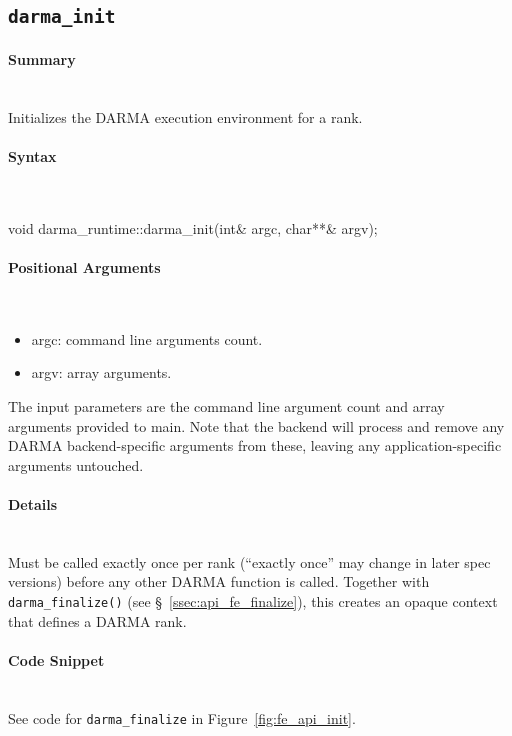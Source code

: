 
\subsection{\texttt{darma\_init}}

\paragraph{Summary}\mbox{}\\
Initializes the DARMA execution environment for a rank.

\paragraph{Syntax}\mbox{}\\
\begin{CppCode}
void darma_runtime::darma_init(int& argc, char**& argv);
\end{CppCode}

\paragraph{Positional Arguments}\mbox{}\\
\begin{itemize}
\item argc: command line arguments count.
\item argv: array arguments.
\end{itemize}
The input parameters are the command line argument count 
and array arguments provided to main.  
Note that the backend will process and remove 
any DARMA backend-specific arguments from these, leaving any
application-specific arguments untouched.


\paragraph{Details}\mbox{}\\
Must be called exactly once per rank (``exactly once'' may change in later
spec versions) before any other DARMA function is called.
Together with \texttt{darma\_finalize()} (see \S~\ref{ssec:api_fe_finalize}),
this creates an opaque context that defines a DARMA rank.

\paragraph{Code Snippet}\mbox{}\\ 
See code for \texttt{darma\_finalize} in Figure~\ref{fig:fe_api_init}.

